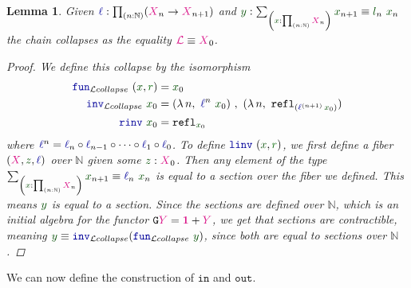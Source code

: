 \documentclass[twoside,11pt,openright]{report}
\theoremstyle{plain} %
\newtheorem{lem}[thm]{Lemma}
\theoremstyle{definition}
\theoremstyle{remark}
\newcommand*{\term}[1]{\textcolor{green!30!black}{#1}} %
\newcommand*{\pathterm}[1]{\textcolor{green!40!black}{#1}}
\newcommand*{\type}[1]{\textcolor{magenta!90!black}{#1}}
\newcommand*{\unit}{\type{\textbf{1}}}
\newcommand*{\function}[1]{\textcolor{blue!60!black}{\ensuremath{\mathtt{#1}}}}
\newcommand*{\functor}[1]{\ensuremath{\mathbf{\mathtt{#1}}}}
\begin{document}
\begin{lem}\label{lem:limit-collapse}
  Given \(\function{\ell} : \prod_{(n : \mathbb{N})} (\type{X}_{n} \rightarrow \type{X}_{n+1})\) and \(\term{y} : \sum_{\left(\term{x} : \prod_{(n : \mathbb{N})} \type{X}_n\right)} \term{x}_{n + 1} \equiv \term{l}_n~\term{x}_n\) the chain collapses as the equality \(\type{\mathcal{L}} \equiv \type{X}_0\).
  \begin{proof}
    We define this collapse by the isomorphism
    \begin{align}
      \function{fun}_{\mathcal{L}collapse}~(\term{x} , \pathterm{r}) &= \term{x}_0 \\
      \function{inv}_{\mathcal{L}collapse}~\term{x}_0 &= (\lambda\,n,~\function{\ell}^n~\term{x}_0)~,~(\lambda\,n,~\mathtt{refl}_{(\function{\ell}^{(n+1)}\,\term{x}_0)}) \\
      \function{rinv}~\term{x}_0 &= \mathtt{refl}_{\term{x}_0}
    \end{align}
    where \(\function{\ell}^n = \function{\ell}_n \circ \function{\ell}_{n-1} \circ \dots \circ \function{\ell}_1 \circ \function{\ell}_0\). To define \(\function{linv}~(\term{x} , \pathterm{r})\), we first define a fiber \((\type{X} , \term{z}, \function{\ell})\) over \(\mathbb{N}\) given some \(\term{z} : \type{X}_0\). Then any element of the type \(\sum_{\left(\term{x} : \prod_{(n : \mathbb{N})} \type{X}_n\right)} \term{x}_{n + 1} \equiv \function{\ell}_n~\term{x}_n\) is equal to a section over the fiber we defined. This means \(\term{y}\) is equal to a section. Since the sections are defined over \(\mathbb{N}\), which is an initial algebra for the functor \(\functor{G}\type{Y} = \unit + \type{Y}\), we get that sections are contractible, meaning \(\term{y} \equiv \function{inv}_{\mathcal{L}collapse} (\function{fun}_{\mathcal{L}collapse}~\term{y})\), since both are equal to sections over \(\mathbb{N}\).
\end{proof}
\end{lem}
\noindent We can now define the construction of \function{in} and \function{out}.
\end{document}
